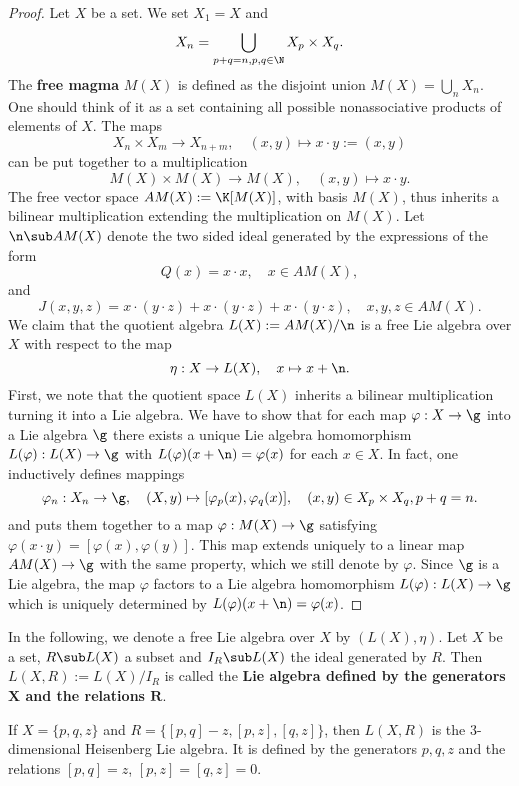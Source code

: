 \begin{proof}
Let $X$ be a set. We set $X_1=X$ and
\[X_n=\bigcup_{p+q=n,p,q\in\N}X_p\times X_q.\]
The \textbf{free magma} $M(X)$ is defined as the disjoint union $M(X)=\bigcup_nX_n$. One should think of it as a set containing all possible nonassociative products of elements of $X$. The maps
\[X_n\times X_m\to X_{n+m},\quad(x,y)\mapsto x\cdot y:=(x,y)\]
can be put together to a multiplication
\[M(X)\times M(X)\to M(X),\quad (x,y)\mapsto x\cdot y.\]
The free vector space $AM(X):=\K[M(X)]$, with basis $M(X)$, thus inherits a bilinear multiplication extending the multiplication on $M(X)$. Let $\n\sub AM(X)$ denote the two sided ideal generated by the expressions of the form
\[Q(x)=x\cdot x,\quad x\in AM(X),\]
and
\[J(x,y,z)=x\cdot(y\cdot z)+x\cdot(y\cdot z)+x\cdot(y\cdot z),\quad x,y,z\in AM(X).\]
We claim that the quotient algebra $L(X):=AM(X)/\n$ is a free Lie algebra over $X$ with respect to the map
\[\eta:X\to L(X),\quad x\mapsto x+\n.\]
First, we note that the quotient space $L(X)$ inherits a bilinear multiplication turning it into a Lie algebra. We have to show that for each map $\varphi:X\to\g$ into a Lie algebra $\g$ there exists a unique Lie algebra homomorphism $L(\varphi):L(X)\to\g$ with $L(\varphi)(x+\n)=\varphi(x)$ for each $x\in X$. In fact, one inductively defines mappings
\[\varphi_n:X_n\to\g,\quad (X,y)\mapsto[\varphi_p(x),\varphi_q(x)],\quad (x,y)\in X_p\times X_q,p+q=n.\]
and puts them together to a map $\varphi:M(X)\to\g$ satisfying $\varphi(x\cdot y)= [\varphi(x),\varphi(y)]$. This map extends uniquely to a linear map $AM(X)\to\g$ with the same property, which we still denote by $\varphi$. Since $\g$ is a Lie algebra, the map $\varphi$ factors to a Lie algebra homomorphism $L(\varphi):L(X)\to\g$ which is uniquely determined by $L(\varphi)(x+\n)=\varphi(x)$.
\end{proof}
In the following, we denote a free Lie algebra over $X$ by $(L(X),\eta)$. Let $X$ be a set, $R\sub L(X)$ a subset and $I_R\sub L(X)$ the ideal generated by $R$. Then $L(X,R):=L(X)/I_R$ is called the \textbf{Lie algebra defined by the generators $\bm{X}$ and the relations $\bm{R}$}.
\begin{example}
If $X=\{p,q,z\}$ and $R=\{[p,q]-z,[p,z],[q,z]\}$, then $L(X,R)$ is the $3$-dimensional Heisenberg Lie algebra. It is defined by the generators $p,q,z$ and the relations $[p,q]=z$, $[p,z]=[q,z]=0$.
\end{example}
